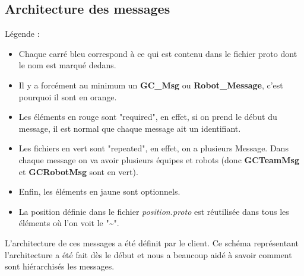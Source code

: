 
\begin{appendix}


\chapter{Architecture des messages} \label{annexe}

Légende :
\begin{itemize}
    \item  Chaque carré bleu correspond à ce qui est contenu dans
    le fichier proto dont le nom est marqué dedans.
    \item Il y a forcément au minimum un \textbf{GC\_Msg} ou
    \textbf{Robot\_Message}, c'est pourquoi il sont en orange.
     \item Les éléments en rouge sont "required", en effet, si on
     prend le début du message, il est normal que chaque message
     ait un identifiant.
    \item Les fichiers en vert sont "repeated", en effet, on a
    plusieurs Message. Dans chaque message on va avoir plusieurs
    équipes et robots (donc \textbf{GCTeamMsg} et
    \textbf{GCRobotMsg} sont en vert).
    \item Enfin, les éléments en jaune sont optionnels.
    \item La position définie dans le fichier
    \textit{position.proto} est réutilisée dans tous les éléments
    où l'on voit le "\textasciitilde". 

\end{itemize}
\bigskip

L'architecture de ces messages a été définit par le client. Ce
schéma représentant l'architecture a été fait dès le début et nous
a beaucoup aidé à savoir comment sont hiérarchisés les messages.
    
\begin{figure}
    \centering
    \label{fig:my_label}
\end{figure}

\end{appendix}
